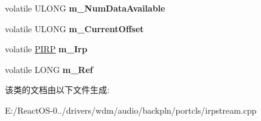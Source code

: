 \begin{DoxyCompactItemize}
\item 
\mbox{\label{class_c_irp_queue_a49fa2d0cc9f84f325cbe8e7cc84d9a35}} 
volatile U\+L\+O\+NG {\bfseries m\+\_\+\+Num\+Data\+Available}
\item 
\mbox{\label{class_c_irp_queue_a48bf774a3584be00d2b4fa1c672ac7bf}} 
volatile U\+L\+O\+NG {\bfseries m\+\_\+\+Current\+Offset}
\item 
\mbox{\label{class_c_irp_queue_ac5ef5afa822c8567fa4b2a025d83a12d}} 
volatile \hyperlink{interfacevoid}{P\+I\+RP} {\bfseries m\+\_\+\+Irp}
\item 
\mbox{\label{class_c_irp_queue_af28c2551c1e2d377c92cea15b470626c}} 
volatile L\+O\+NG {\bfseries m\+\_\+\+Ref}
\end{DoxyCompactItemize}


该类的文档由以下文件生成\+:\begin{DoxyCompactItemize}
\item 
E\+:/\+React\+O\+S-\/0../drivers/wdm/audio/backpln/portcls/irpstream.\+cpp\end{DoxyCompactItemize}
